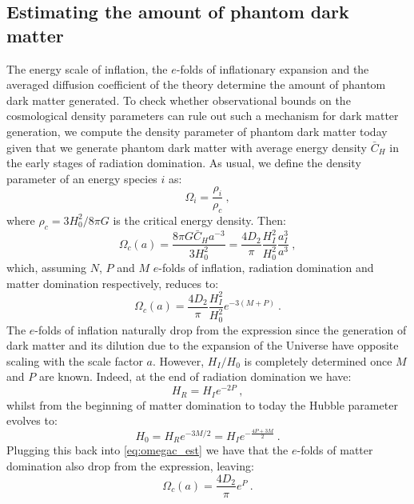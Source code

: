 \documentclass[amsmath,amssymb,11pt]{article}
\begin{document}
\subsection{Estimating the amount of phantom dark matter}

The energy scale of inflation, the $e$-folds of inflationary expansion and the averaged diffusion coefficient of the theory determine the amount of phantom dark matter generated. To check whether observational bounds on the cosmological density parameters can rule out such a mechanism for dark matter generation, we compute the density parameter of phantom dark matter today given that we generate phantom dark matter with average energy density $\bar{C}_H$ in the early stages of radiation domination. As usual, we define the density parameter of an energy species $i$ as:
\begin{equation}
    \Omega_i = \frac{\rho_i}{\rho_c} \ ,
\end{equation}
where $\rho_c = 3 H_0^2 /8\pi G$ is the critical energy density. Then:
\begin{equation}
    \Omega_c(a) = \frac{8\pi G \bar{C}_H a^{-3}}{3 H_0^2} =  \frac{4 D_2 }{\pi}\frac{H_I^2}{H_0^2}\frac{a_I^{3}}{a^{3}} \ ,
\end{equation}
which, assuming $N$, $P$ and $M$ $e$-folds of inflation, radiation domination and matter domination respectively, reduces to:
\begin{equation}
\label{eq:omegac_est}
     \Omega_c(a) =  \frac{4 D_2 }{\pi} \frac{H_I^2}{H_0^2} e^{-3(M+P)} \ .
\end{equation}
The $e$-folds of inflation naturally drop from the expression since the generation of dark matter and its dilution due to the expansion of the Universe have opposite scaling with the scale factor $a$. However, $H_I/H_0$ is completely determined once $M$ and $P$ are known. Indeed, at the end of radiation domination we have:
\begin{equation}
    H_R = H_I e^{-2P} \ ,
\end{equation}
whilst from the beginning of matter domination to today the Hubble parameter evolves to:
\begin{equation}
    H_0 = H_R e^{-3M/2} = H_I e^{-\frac{4P + 3M}{2}} \ .
\end{equation}
Plugging this back into \eqref{eq:omegac_est} we have that the $e$-folds of matter domination also drop from the expression, leaving:
\begin{equation}
     \Omega_c(a) = \frac{4 D_2 }{\pi}  e^{P} \ .
\end{equation} 
\end{document}
